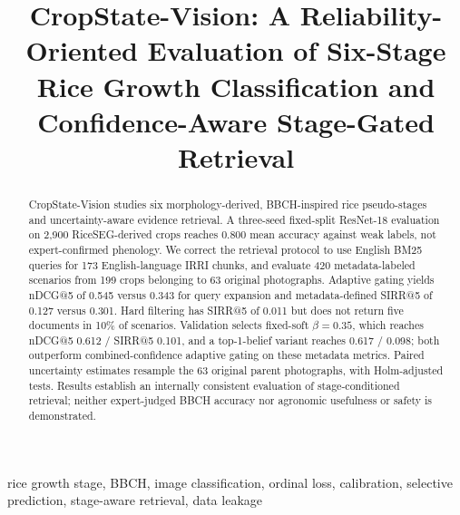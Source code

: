 \documentclass[conference,a4paper]{IEEEtran}
\begin{document}
\title{CropState-Vision: A Reliability-Oriented Evaluation of Six-Stage Rice Growth Classification and Confidence-Aware Stage-Gated Retrieval}

\author{
\and
{}
}

\maketitle

\begin{abstract}
CropState-Vision studies six morphology-derived, BBCH-inspired rice pseudo-stages and uncertainty-aware evidence retrieval. A three-seed fixed-split ResNet-18 evaluation on 2{,}900 RiceSEG-derived crops reaches 0.800 mean accuracy against weak labels, not expert-confirmed phenology. We correct the retrieval protocol to use English BM25 queries for 173 English-language IRRI chunks, and evaluate 420 metadata-labeled scenarios from 199 crops belonging to 63 original photographs. Adaptive gating yields nDCG@5 of 0.545 versus 0.343 for query expansion and metadata-defined SIRR@5 of 0.127 versus 0.301. Hard filtering has SIRR@5 of 0.011 but does not return five documents in 10\% of scenarios. Validation selects fixed-soft $\beta=0.35$, which reaches nDCG@5 0.612 / SIRR@5 0.101, and a top-1-belief variant reaches 0.617 / 0.098; both outperform combined-confidence adaptive gating on these metadata metrics. Paired uncertainty estimates resample the 63 original parent photographs, with Holm-adjusted tests. Results establish an internally consistent evaluation of stage-conditioned retrieval; neither expert-judged BBCH accuracy nor agronomic usefulness or safety is demonstrated.

\end{abstract}

\begin{IEEEkeywords}
rice growth stage, BBCH, image classification, ordinal loss, calibration, selective prediction, stage-aware retrieval, data leakage
\end{IEEEkeywords}
\end{document}
